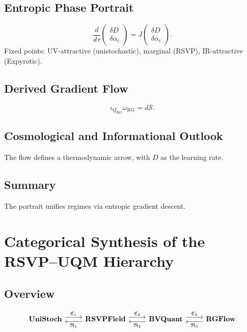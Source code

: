 \documentclass[12pt]{article}
\begin{document}
\subsection{Entropic Phase Portrait}

\[
\frac{d}{d\tau} \begin{pmatrix} \delta D \\ \delta \alpha_i \end{pmatrix} = J \begin{pmatrix} \delta D \\ \delta \alpha_i \end{pmatrix}.
\]
Fixed points: UV-attractive (unistochastic), marginal (RSVP), IR-attractive (Expyrotic).

\subsection{Derived Gradient Flow}

\[
\iota_{Q_{\mathrm{RG}}} \omega_{\mathrm{RG}} = d \mathcal{S}.
\]

\subsection{Cosmological and Informational Outlook}

The flow defines a thermodynamic arrow, with \(D\) as the learning rate.

\subsection{Summary}

The portrait unifies regimes via entropic gradient descent.

\section{Categorical Synthesis of the RSVP–UQM Hierarchy}
\label{app:categorical}

\subsection{Overview}

\[
\begin{tikzcd}
\mathbf{UniStoch} \arrow[r, shift left=.7ex, "\mathfrak{C}_1"] & \mathbf{RSVPField} \arrow[r, shift left=.7ex, "\mathfrak{C}_2"] \arrow[l, shift left=.7ex, "\mathfrak{R}_1"] & \mathbf{BVQuant} \arrow[r, shift left=.7ex, "\mathfrak{C}_3"] \arrow[l, shift left=.7ex, "\mathfrak{R}_2"] & \mathbf{RGFlow} \arrow[l, shift left=.7ex, "\mathfrak{R}_3"]
\end{tikzcd}
\]
\end{document}
